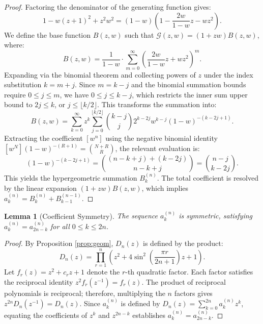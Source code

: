 \documentclass[11pt]{article}
\newtheorem{lemma}[theorem]{Lemma}
\begin{document}
\begin{proof}
Factoring the denominator of the generating function gives:
\begin{equation*}
1 - w(z+1)^2 + z^2w^2 = (1-w)\left(1 - \frac{2w}{1-w}z - wz^2\right).
\end{equation*}
We define the base function $B(z,w)$ such that $\mathcal{G}(z,w) = (1+zw)B(z,w)$, where:
\begin{equation*}
B(z,w) = \frac{1}{1-w} \cdot \sum_{m=0}^\infty \left(\frac{2w}{1-w}z + wz^2\right)^m.
\end{equation*}
Expanding via the binomial theorem and collecting powers of $z$ under the index substitution $k = m+j$. Since $m = k-j$ and the binomial summation bounds require $0 \le j \le m$, we have $0 \le j \le k-j$, which restricts the inner sum upper bound to $2j \le k$, or $j \le \lfloor k/2 \rfloor$. This transforms the summation into:
\begin{equation*}
B(z,w) = \sum_{k=0}^\infty z^k \sum_{j=0}^{\lfloor k/2 \rfloor} \binom{k-j}{j} 2^{k-2j} w^{k-j} (1-w)^{-(k-2j+1)}.
\end{equation*}
Extracting the coefficient $[w^n]$ using the negative binomial identity $[w^N] (1-w)^{-(R+1)} = \binom{N+R}{R}$, the relevant evaluation is:
\begin{equation*}
[w^{n-(k-j)}] (1-w)^{-(k-2j+1)} = \binom{(n-k+j) + (k-2j)}{n-k+j} = \binom{n-j}{k-2j}.
\end{equation*}
This yields the hypergeometric summation $B_k^{(n)}$. The total coefficient is resolved by the linear expansion $(1+zw)B(z,w)$, which implies $a_k^{(n)} = B_k^{(n)} + B_{k-1}^{(n-1)}$.
\end{proof}

\begin{lemma}[Coefficient Symmetry]
The sequence $a_k^{(n)}$ is symmetric, satisfying $a_k^{(n)} = a_{2n-k}^{(n)}$ for all $0 \le k \le 2n$.
\end{lemma}

\begin{proof}
By Proposition \ref{prop:geom}, $D_n(z)$ is defined by the product:
\[
D_n(z) = \prod_{r=1}^n \left(z^2 + 4\sin^2\left(\frac{\pi r}{2n+1}\right)z + 1\right).
\]
Let $f_r(z) = z^2 + c_r z + 1$ denote the $r$-th quadratic factor. Each factor satisfies the reciprocal identity $z^2 f_r(z^{-1}) = f_r(z)$. The product of reciprocal polynomials is reciprocal; therefore, multiplying the $n$ factors gives $z^{2n}D_n(z^{-1}) = D_n(z)$. Since $a_k^{(n)}$ is defined by $D_n(z) = \sum_{k=0}^{2n} a_k^{(n)} z^k$, equating the coefficients of $z^k$ and $z^{2n-k}$ establishes $a_k^{(n)} = a_{2n-k}^{(n)}$.
\end{proof}
\end{document}
